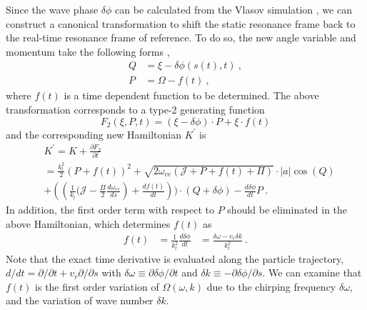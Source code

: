 Since the wave phase $\delta \phi$ can be calculated from the Vlasov simulation
 \cite{zheng2024}, we can construct a canonical transformation to shift the static resonance frame back to the real-time resonance frame of reference.
To do so, the new angle variable and momentum  take the following forms \cite{berk1999},
\begin{equation}
    \begin{aligned}
        Q &= \xi - \delta \phi(s(t),t)~,
        \\
        P & = \Omega - f(t)~,
    \end{aligned}
\end{equation}
where $f(t)$ is a time dependent function to be determined.
The above transformation corresponds to a type-2 generating function
\begin{equation}
    F_2(\xi,P,t) = (\xi - \delta \phi) \cdot P + \xi \cdot f(t)
\end{equation}
and the corresponding new Hamiltonian $K^\prime$ is
\begin{equation}
    \begin{aligned}
        &  K^\prime = K + \frac{\partial F_2}{\partial t}
        \\
        & = \frac{k_l^2}{2}(P+f(t))^2 
        + \sqrt{2\omega_{ce}(\mathcal{J}+P+f(t)+\Pi)} \cdot |a|\cos(Q) 
        \\
        & + \left(\left(\frac{1}{k_l}(\mathcal{J} - \frac{\Pi}{2} \frac{d\omega_{ce}}{ds}\right)  +\frac{d f(t)}{d t} \right))\cdot(Q + \delta \phi)  - \frac{d \delta \phi}{d t} P ~. 
        \end{aligned}
\end{equation}
In addition,  the first order term with respect to $P$ 
should be eliminated
in the above Hamiltonian, which determines $f(t)$ as
\begin{equation}\label{eq.ft}
    \begin{aligned}
    f(t) & = \frac{1}{k_l^2} \frac{d \delta \phi}{d t}  &= \frac{\delta \omega - v_r \delta k}{k_l^2}~.
    \end{aligned}
\end{equation} 
Note that the exact time derivative is evaluated along the particle trajectory, $d/dt = \partial/\partial t + v_r \partial /\partial s$ with $\delta \omega  \equiv \partial \delta \phi/\partial t$ and $\delta k  \equiv -\partial \delta \phi/\partial s$.
We can examine that $f(t)$ is the first order variation of $\Omega(\omega,k)$ due to the chirping frequency $\delta \omega$, and the variation of wave number $\delta k$.

